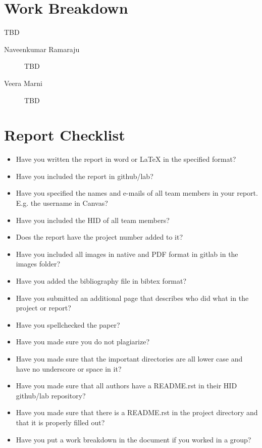 \documentclass[9pt,twocolumn,twoside]{styles/osajnl}
\begin{document}
\endgroup

\newpage

\appendix

\section{Work Breakdown}

TBD

\begin{description}

\item[Naveenkumar Ramaraju] TBD

\item[Veera Marni] TBD


\end{description}

\section{Report Checklist}

\begin{itemize}
\renewcommand{\labelitemi}{\scriptsize$\square$} 
\item Have you written the report in word or LaTeX in the specified
  format?
\item Have you included the report in github/lab?
\item Have you specified the names and e-mails of all team members in
  your report. E.g. the username in Canvas?
\item Have you included the HID of all team members?
\item Does the report have the project number added to it?
\item Have you included all images in native and PDF format in gitlab
  in the images folder?
\item Have you added the bibliography file in bibtex format?
\item Have you submitted an additional page that describes who did
  what in the project or report?
\item Have you spellchecked the paper?
\item Have you made sure you do not plagiarize?
\item Have you made sure that the important directories are all lower
  case and have no underscore or space in it?
\item Have you made sure that all authors have a README.rst in their
  HID github/lab repository?
\item Have you made sure that there is a README.rst in the project
  directory and that it is properly filled out?
\item Have you put a work breakdown in the document if you worked in a
  group?
\end{itemize}
\end{document}
